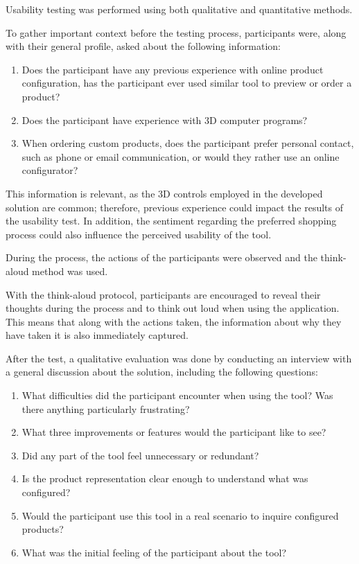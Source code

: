 Usability testing was performed using both qualitative and quantitative methods.

To gather important context before the testing process, participants were, along with their general profile, asked about the following information: 
\begin{enumerate}
    \item Does the participant have any previous experience with online product configuration, has the participant ever used similar tool to preview or order a product?
    \item Does the participant have experience with 3D computer programs?
    \item When ordering custom products, does the participant prefer personal contact, such as phone or email communication, or would they rather use an online configurator?
\end{enumerate}
This information is relevant, as the 3D controls employed in the developed solution are common; therefore, previous experience could impact the results of the usability test. In addition, the sentiment regarding the preferred shopping process could also influence the perceived usability of the tool.

During the process, the actions of the participants were observed and the think-aloud method was used.

With the think-aloud protocol, participants are encouraged to reveal their thoughts during the process and to think out loud when using the application. This means that along with the actions taken, the information about why they have taken it is also immediately captured.~\cite{Moran2019}

After the test, a qualitative evaluation was done by conducting an interview with a general discussion about the solution, including the following questions:
\begin{enumerate}
    \item What difficulties did the participant encounter when using the tool? Was there anything particularly frustrating?
    \item What three improvements or features would the participant like to see?
    \item Did any part of the tool feel unnecessary or redundant?
    \item Is the product representation clear enough to understand what was configured?
    \item Would the participant use this tool in a real scenario to inquire configured products?
    \item What was the initial feeling of the participant about the tool?
\end{enumerate}

